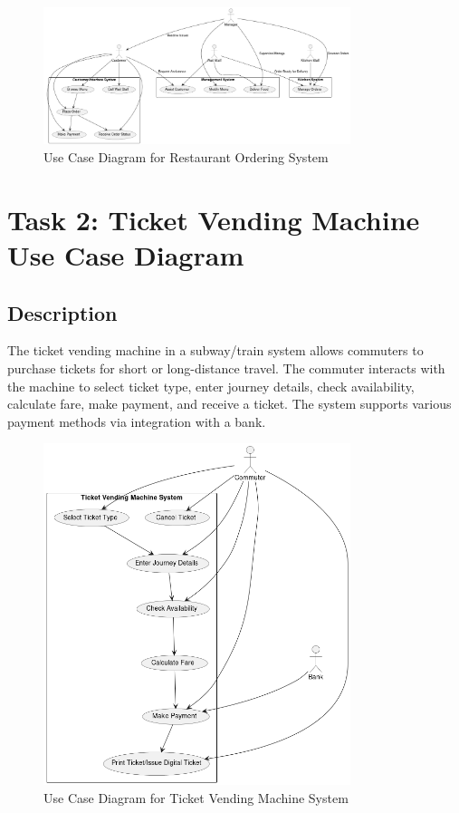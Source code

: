 \documentclass[a4paper,12pt]{article}
\begin{document}
\begin{figure}[h!]
    \centering
    \includegraphics[width=0.8\textwidth]{task1.png}
    \caption{Use Case Diagram for Restaurant Ordering System}
\end{figure}

\clearpage

\section{Task 2: Ticket Vending Machine Use Case Diagram}

\subsection*{Description}
The ticket vending machine in a subway/train system allows commuters to purchase tickets for short or long-distance travel. The commuter interacts with the machine to select ticket type, enter journey details, check availability, calculate fare, make payment, and receive a ticket. The system supports various payment methods via integration with a bank.


\begin{figure}[h!]
    \centering
    \includegraphics[width=0.8\textwidth]{task3.png}
    \caption{Use Case Diagram for Ticket Vending Machine System}
\end{figure}
\end{document}
